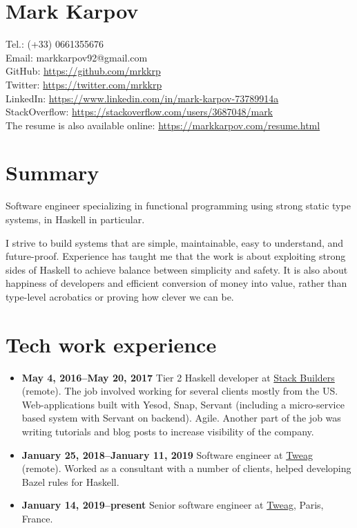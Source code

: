 \documentclass[a4paper,12pt]{article}
\begin{document}
\section*{Mark Karpov}

Tel.: (+33) 0661355676\\
Email: markkarpov92@gmail.com\\
GitHub: \href{https://github.com/mrkkrp}{https://github.com/mrkkrp}\\
Twitter: \href{https://twitter.com/mrkkrp}{https://twitter.com/mrkkrp}\\
LinkedIn: \href{https://www.linkedin.com/in/mark-karpov-73789914a}{https://www.linkedin.com/in/mark-karpov-73789914a}\\
StackOverflow: \href{https://stackoverflow.com/users/3687048/mark}{https://stackoverflow.com/users/3687048/mark}\\
The resume is also available online: \href{https://markkarpov.com/resume.html}{https://markkarpov.com/resume.html}

\sectionfont{\fontsize{12}{15}\selectfont\sectionrule{0pt}{0pt}{-5pt}{0.8pt}}

\section*{Summary}

Software engineer specializing in functional programming using strong static
type systems, in Haskell in particular.

I strive to build systems that are simple, maintainable, easy to understand,
and future-proof. Experience has taught me that the work is about exploiting
strong sides of Haskell to achieve balance between simplicity and safety. It
is also about happiness of developers and efficient conversion of money into
value, rather than type-level acrobatics or proving how clever we can be.

\section*{Tech work experience}

\begin{itemize}[noitemsep]
\item \textbf{May 4, 2016--May 20, 2017} Tier 2 Haskell developer at
  \href{https://www.stackbuilders.com/}{Stack Builders} (remote). The job
  involved working for several clients mostly from the US. Web-applications
  built with Yesod, Snap, Servant (including a micro-service based system
  with Servant on backend). Agile. Another part of the job was writing
  tutorials and blog posts to increase visibility of the company.
\item \textbf{January 25, 2018--January 11, 2019} Software engineer at
  \href{https://tweag.io}{Tweag} (remote). Worked as a consultant with a
  number of clients, helped developing Bazel rules for Haskell.
\item \textbf{January 14, 2019--present} Senior software engineer at
  \href{https://tweag.io}{Tweag}, Paris, France.
\end{itemize}
\end{document}
